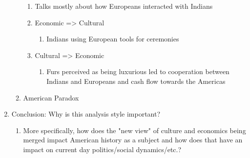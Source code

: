\documentclass[letterpaper]{article}
\begin{document}
\begin{enumerate}
\begin{enumerate}
\begin{enumerate}
\item Talks mostly about how Europeans interacted with Indians
\item Economic => Cultural

\begin{enumerate}
\item Indians using European tools for ceremonies
\end{enumerate}

\item Cultural => Economic

\begin{enumerate}
\item Furs perceived as being luxurious led to cooperation between
Indians and Europeans and cash flow towards the Americas
\end{enumerate}
\end{enumerate}

\item American Paradox
\end{enumerate}

\item Conclusion: Why is this analysis style important?

\begin{enumerate}
\item More specifically, how does the "new view" of culture and
economics being merged impact American history as a subject and
how does that have an impact on current day politics/social
dynamics/etc.?
\end{enumerate}
\end{enumerate}
\end{document}
